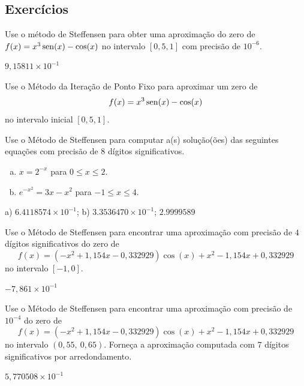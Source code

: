 \subsection*{Exercícios}

\begin{exer}
  Use o método de Steffensen para obter uma aproximação do zero de $f(x)=x^3\operatorname{sen}(x)-\cos(x)$ no intervalo $[0,5, 1]$ com precisão de $10^{-6}$.
\end{exer}
\begin{resp}
    $9,15811\times 10^{-1}$
\end{resp}

\begin{exer}
  Use o Método da Iteração de Ponto Fixo para aproximar um zero de
  \begin{equation}
    f(x)=x^3\operatorname{sen}(x)-\cos(x)
  \end{equation}
  no intervalo inicial $[0,5, 1]$.
\end{exer}

\begin{exer}
  Use o Método de Steffensen para computar a(s) solução(ões) das seguintes equações com precisão de 8 dígitos significativos.
  \begin{enumerate}[a)]
  \item $x = 2^{-x}$ para $0\leq x \leq 2$.
  \item $e^{-x^2} = 3x - x^2$ para $-1\leq x\leq 4$.
  \end{enumerate}
\end{exer}
\begin{resp}
  a) $6.4118574\times 10^{-1}$; b) $3.3536470\times 10^{-1}$; $2.9999589$
\end{resp}

\begin{exer}
  Use o Método de Steffensen para encontrar uma aproximação com precisão de $4$ dígitos significativos do zero de 
  \begin{equation}
    f(x) = (-x^2+1,154x-0,332929)\cos(x) + x^2 - 1,154x + 0,332929
  \end{equation}
  no intervalo $[-1, 0]$.
\end{exer}
\begin{resp}
  $-7,861\times 10^{-1}$
\end{resp}

\begin{exer}
  Use o Método de Steffensen para encontrar uma aproximação com precisão de $10^{-4}$ do zero de
  \begin{equation}
    f(x) = (-x^2+1,154x-0,332929)\cos(x) + x^2 - 1,154x + 0,332929
  \end{equation}
no intervalo $(0,55, ~0,65)$. Forneça a aproximação computada com $7$ dígitos significativos por arredondamento.
\end{exer}
\begin{resp}
  $5,770508\times 10^{-1}$
\end{resp}

